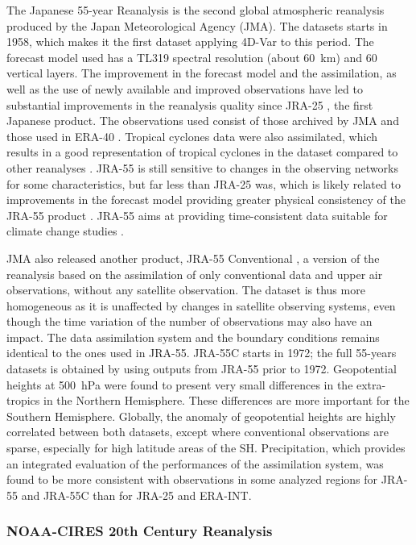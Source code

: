 \documentclass{ametsoc}
\begin{document}
The Japanese 55-year Reanalysis \citep[JRA-55, ][]{Kobayashi2015, Harada2016} is the second global atmospheric reanalysis produced by the Japan Meteorological Agency (JMA). The datasets starts in 1958, which makes it the first dataset applying 4D-Var to this period. The forecast model used has a TL319 spectral resolution (about 60~km) and 60 vertical layers. The improvement in the forecast model and the assimilation, as well as the use of newly available and improved observations have led to substantial improvements in the reanalysis quality since JRA-25 \citep{Kobayashi2015, Harada2016}, the first Japanese product. The observations used consist of those archived by JMA and those used in ERA-40 \citep{Uppala2005}. Tropical cyclones data were also assimilated, which results in a good representation of tropical cyclones in the dataset compared to other reanalyses \citep{Harada2016}. JRA-55 is still sensitive to changes in the observing networks for some characteristics, but far less than JRA-25 was, which is likely related to improvements in the forecast model providing greater physical consistency of the JRA-55 product \citep{Kobayashi2015}. JRA-55 aims at providing time-consistent data suitable for climate change studies \citep{Ebita2011}.

JMA also released another product, JRA-55 Conventional \citep[JRA-55C,][]{Kobayashi2014}, a version of the reanalysis based on the assimilation of only conventional data and upper air observations, without any satellite observation. The dataset is thus more homogeneous as it is unaffected by changes in satellite observing systems, even though the time variation of the number of observations may also have an impact. The data assimilation system and the boundary conditions remains identical to the ones used in JRA-55. JRA-55C starts in 1972; the full 55-years datasets is obtained by using outputs from JRA-55 prior to 1972. Geopotential heights at 500~hPa were found to present very small differences in the extra-tropics in the Northern Hemisphere. These differences are more important for the Southern Hemisphere. Globally, the anomaly  of geopotential heights are highly correlated between both datasets, except where conventional observations are sparse, especially for high latitude areas of the SH. Precipitation, which provides an integrated evaluation of the performances of the assimilation system, was found to be more consistent with observations in some analyzed regions for JRA-55 and JRA-55C than for JRA-25 and ERA-INT.


\subsubsection{NOAA-CIRES 20th Century Reanalysis}
\end{document}
